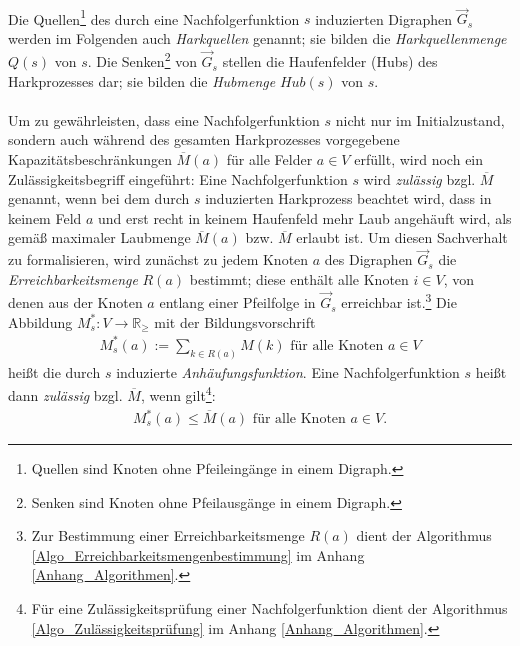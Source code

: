 \documentclass[fontsize=12pt,doubleside,openany,listof=totoc,listof=flat,listof=nochaptergap,numbers=noenddot]{scrbook}
\theoremstyle{style}
\begin{document}
\phantom \\
\noindent Die Quellen\footnote{Quellen sind Knoten ohne Pfeileingänge in einem Digraph.} des durch eine Nachfolgerfunktion $s$ induzierten Digraphen $\vec{G}_s$ werden im Folgenden auch \textit{Harkquellen}\label{Harkquelle} genannt; sie bilden die \textit{Harkquellenmenge} \label{Harkquellenmenge} $Q(s)$ von $s$. Die Senken\footnote{Senken sind Knoten ohne Pfeilausgänge in einem Digraph.} von $\vec{G}_s$ stellen die Haufenfelder (Hubs) des Harkprozesses dar; sie bilden die \textit{Hubmenge}\label{Hubmenge} $Hub(s)$ von $s$.\\
\\
Um zu gewährleisten, dass eine Nachfolgerfunktion $s$ nicht nur im Initialzustand, sondern auch während des gesamten Harkprozesses vorgegebene Kapazitätsbeschränkungen $\overline{M}(a)$ für alle Felder $a \in V$ erfüllt, wird noch ein Zulässigkeitsbegriff eingeführt: Eine Nachfolgerfunktion $s$ wird \textit{zulässig} bzgl. $\overline{M}$ genannt, wenn bei dem durch $s$ induzierten Harkprozess beachtet wird, dass in keinem Feld $a$ und erst recht in keinem Haufenfeld mehr Laub angehäuft wird, als gemäß maximaler Laubmenge $\overline{M}(a)$ bzw. $\overline{M}$ erlaubt ist. Um diesen Sachverhalt zu formalisieren, wird zunächst zu jedem Knoten $a$ des Digraphen $\vec{G}_s$ die \textit{Erreichbarkeitsmenge}\label{Erreichbarkeitsmenge} $R(a)$ bestimmt; diese enthält alle Knoten $i \in V$, von denen aus der Knoten $a$ entlang einer Pfeilfolge in $\vec{G}_s$ erreichbar ist.\footnote{Zur Bestimmung einer Erreichbarkeitsmenge $R(a)$ dient der Algorithmus \ref{Algo_Erreichbarkeitsmengenbestimmung} im Anhang \ref{Anhang_Algorithmen}.} Die Abbildung $M^*_s:V \rightarrow \mathbb{R}_\geq$ mit der Bildungsvorschrift 
\begin{align}
M^*_s(a) := \sum\limits_{k \in R(a)}M(k) \text{ für alle Knoten } a \in V \label{Definition_Anhäufungsfunktion}
\end{align}
heißt die durch $s$ induzierte \textit{Anhäufungsfunktion}\label{Anhäufungsfunktion}. Eine Nachfolgerfunktion $s$ heißt dann \textit{zulässig} bzgl. $\overline{M}$, wenn gilt\footnote{Für eine Zulässigkeitsprüfung einer Nachfolgerfunktion dient der Algorithmus \ref{Algo_Zulässigkeitsprüfung} im Anhang \ref{Anhang_Algorithmen}.}:
\begin{align}
M^*_s(a) \leq \overline{M}(a) \text{ für alle Knoten } a \in V. \label{Formel_Zulässigkeit_Nachfolgerfunktion}
\end{align}
\end{document}
